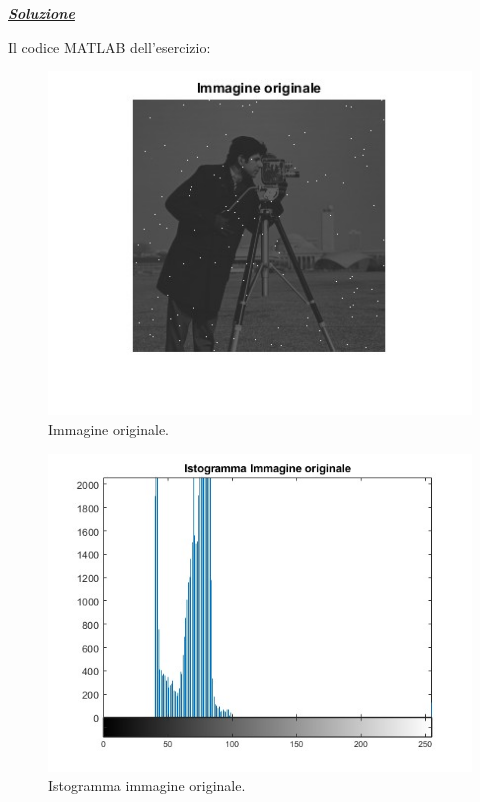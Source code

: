 \documentclass[a4paper]{article}
\begin{document}
	\noindent
	\textcolor{Green4}{\textbf{\emph{\underline{Soluzione}}}}\newline
	
	\noindent
	Il codice MATLAB dell'esercizio:
	\newpage
	
	\begin{figure}[!htp]
		\centering
		\includegraphics[width=.9\textwidth]{img/lab/operatori_puntuali-5.jpg}
		\caption{Immagine originale.}
	\end{figure}
	\begin{figure}[!htp]
		\centering
		\includegraphics[width=.9\textwidth]{img/lab/operatori_puntuali-6.jpg}
		\caption{Istogramma immagine originale.}
	\end{figure}\newpage
	
\end{document}
